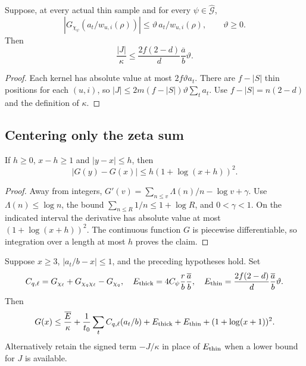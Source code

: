 \begin{lemma}
\label{rh-thin}
Suppose, at every actual thin sample and for every
$\psi\in\widehat{\mathcal G}$,
\[
 |G_{\chi_\psi}(a_t/w_{u,i}(\rho))|
       \le\vartheta\,a_t/w_{u,i}(\rho),\qquad\vartheta\ge0.
\]
Then
\begin{equation}\label{rh-thin-bound}
 \frac{|J|}{\kappa}\le
       \frac{2f(2-d)}d\frac{\overline a}{b}\vartheta.
\end{equation}
\end{lemma}

\begin{proof}
Each kernel has absolute value at most $2f\vartheta a_t$.
There are $f-|S|$ thin positions for each $(u,i)$, so
$|J|\le2m(f-|S|)\vartheta\sum_ta_t$.
Use $f-|S|=n(2-d)$ and the definition of $\kappa$.
\end{proof}

\subsection{Centering only the zeta sum}

\begin{lemma}\label{rh-centering}
If $h\ge0$, $x-h\ge1$ and $|y-x|\le h$, then
\[
 |G(y)-G(x)|\le h(1+\log(x+h))^2.
\]
\end{lemma}

\begin{proof}
Away from integers,
$G'(v)=\sum_{n\le v}\Lambda(n)/n-\log v+\gamma$.
Use $\Lambda(n)\le\log n$, the bound
$\sum_{n\le R}1/n\le1+\log R$, and $0<\gamma<1$.
On the indicated interval the derivative has absolute value at most
$(1+\log(x+h))^2$. The continuous function $G$ is piecewise
differentiable, so integration over a length at most $h$ proves the claim.
\end{proof}

\begin{corollary}
\label{rh-direct-budget}
Suppose $x\ge3$, $|a_t/b-x|\le1$, and the preceding hypotheses hold.
Set
\[
 C_{q,\ell}=G_{\chi_\ell}+G_{\chi_q\chi_\ell}-G_{\chi_q},
 \quad
 E_{\rm thick}=4C_\psi\frac rb\frac{\overline a}{b},\quad
 E_{\rm thin}=\frac{2f(2-d)}d\frac{\overline a}{b}\vartheta.
\]
Then
\begin{equation}\label{rh-full-budget}
 G(x)\le\frac{\overline E}{\kappa}
     +\frac1{t_0}\sum_tC_{q,\ell}(a_t/b)
     +E_{\rm thick}+E_{\rm thin}+(1+\log(x+1))^2.
\end{equation}
Alternatively retain the signed term $-J/\kappa$ in place of
$E_{\rm thin}$ when a lower bound for $J$ is available.
\end{corollary}

